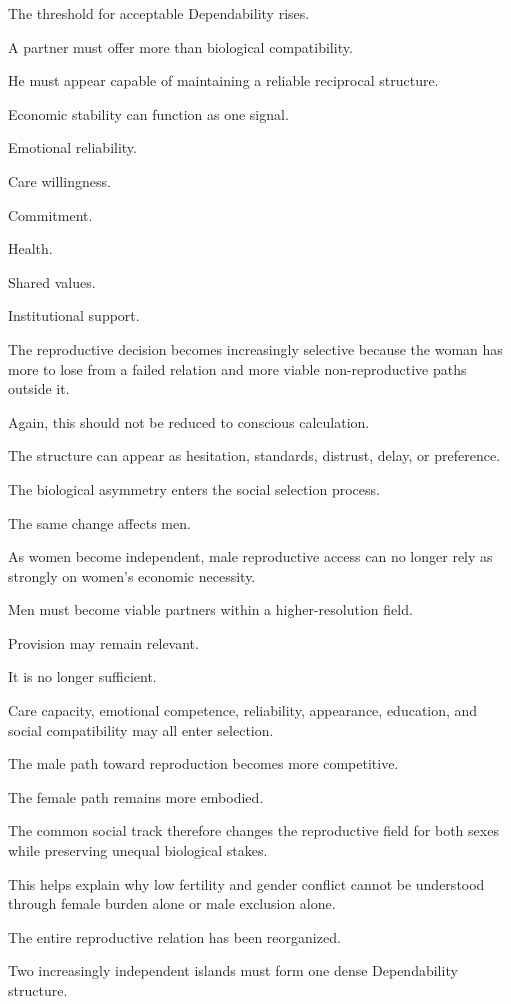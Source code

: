 The threshold for acceptable Dependability rises.

A partner must offer more than biological compatibility.

He must appear capable of maintaining a reliable reciprocal structure.

Economic stability can function as one signal.

Emotional reliability.

Care willingness.

Commitment.

Health.

Shared values.

Institutional support.

The reproductive decision becomes increasingly selective because the woman has more to lose from a failed relation and more viable non-reproductive paths outside it.

Again, this should not be reduced to conscious calculation.

The structure can appear as hesitation, standards, distrust, delay, or preference.

The biological asymmetry enters the social selection process.

The same change affects men.

As women become independent, male reproductive access can no longer rely as strongly on women’s economic necessity.

Men must become viable partners within a higher-resolution field.

Provision may remain relevant.

It is no longer sufficient.

Care capacity, emotional competence, reliability, appearance, education, and social compatibility may all enter selection.

The male path toward reproduction becomes more competitive.

The female path remains more embodied.

The common social track therefore changes the reproductive field for both sexes while preserving unequal biological stakes.

This helps explain why low fertility and gender conflict cannot be understood through female burden alone or male exclusion alone.

The entire reproductive relation has been reorganized.

Two increasingly independent islands must form one dense Dependability structure.

